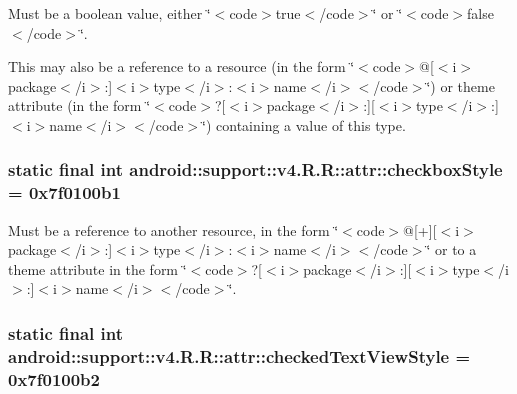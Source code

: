 Must be a boolean value, either \char`\"{}$<$code$>$true$<$/code$>$\char`\"{} or \char`\"{}$<$code$>$false$<$/code$>$\char`\"{}. 

This may also be a reference to a resource (in the form \char`\"{}$<$code$>$@\mbox{[}$<$i$>$package$<$/i$>$:\mbox{]}$<$i$>$type$<$/i$>$:$<$i$>$name$<$/i$>$$<$/code$>$\char`\"{}) or theme attribute (in the form \char`\"{}$<$code$>$?\mbox{[}$<$i$>$package$<$/i$>$:\mbox{]}\mbox{[}$<$i$>$type$<$/i$>$:\mbox{]}$<$i$>$name$<$/i$>$$<$/code$>$\char`\"{}) containing a value of this type. \hypertarget{classandroid_1_1support_1_1v4_1_1_r_1_1attr_10d1658f5e3d7e6fe48718949b234e53}{
\subsubsection[{checkboxStyle}]{\setlength{\rightskip}{0pt plus 5cm}static final int android::support::v4.R.R::attr::checkboxStyle = 0x7f0100b1}}
\label{classandroid_1_1support_1_1v4_1_1_r_1_1attr_10d1658f5e3d7e6fe48718949b234e53}


Must be a reference to another resource, in the form \char`\"{}$<$code$>$@\mbox{[}+\mbox{]}\mbox{[}$<$i$>$package$<$/i$>$:\mbox{]}$<$i$>$type$<$/i$>$:$<$i$>$name$<$/i$>$$<$/code$>$\char`\"{} or to a theme attribute in the form \char`\"{}$<$code$>$?\mbox{[}$<$i$>$package$<$/i$>$:\mbox{]}\mbox{[}$<$i$>$type$<$/i$>$:\mbox{]}$<$i$>$name$<$/i$>$$<$/code$>$\char`\"{}. \hypertarget{classandroid_1_1support_1_1v4_1_1_r_1_1attr_ba2f4458e204001b44d5e81cc756e7d1}{
\subsubsection[{checkedTextViewStyle}]{\setlength{\rightskip}{0pt plus 5cm}static final int android::support::v4.R.R::attr::checkedTextViewStyle = 0x7f0100b2}}
\label{classandroid_1_1support_1_1v4_1_1_r_1_1attr_ba2f4458e204001b44d5e81cc756e7d1}


